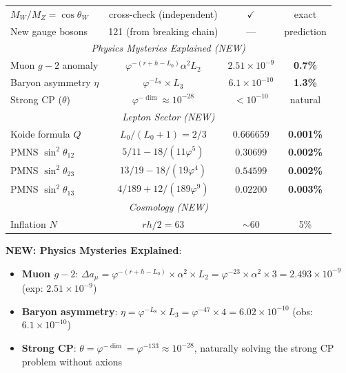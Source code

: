 \documentclass[11pt,a4paper]{article}
\begin{document}
\begin{center}
\begin{tabular}{|l|c|c|c|}
$M_W/M_Z = \cos\theta_W$ & cross-check (independent) & $\checkmark$ & exact \\
New gauge bosons & 121 (from breaking chain) & --- & prediction \\
\hline
\multicolumn{4}{|c|}{\textit{Physics Mysteries Explained (NEW)}} \\
\hline
Muon $g-2$ anomaly & $\varphi^{-(r+h-L_0)} \alpha^2 L_2$ & $2.51 \times 10^{-9}$ & \textbf{0.7\%} \\
Baryon asymmetry $\eta$ & $\varphi^{-L_8} \times L_3$ & $6.1 \times 10^{-10}$ & \textbf{1.3\%} \\
Strong CP ($\theta$) & $\varphi^{-\dim} \approx 10^{-28}$ & $< 10^{-10}$ & natural \\
\hline
\multicolumn{4}{|c|}{\textit{Lepton Sector (NEW)}} \\
\hline
Koide formula $Q$ & $L_0/(L_0+1) = 2/3$ & 0.666659 & \textbf{0.001\%} \\
PMNS $\sin^2\theta_{12}$ & $5/11 - 18/(11\varphi^5)$ & $0.30699$ & \textbf{0.002\%} \\
PMNS $\sin^2\theta_{23}$ & $13/19 - 18/(19\varphi^4)$ & $0.54599$ & \textbf{0.002\%} \\
PMNS $\sin^2\theta_{13}$ & $4/189 + 12/(189\varphi^9)$ & $0.02200$ & \textbf{0.003\%} \\
\hline
\multicolumn{4}{|c|}{\textit{Cosmology (NEW)}} \\
\hline
Inflation $N$ & $rh/2 = 63$ & $\sim 60$ & 5\% \\
\hline
\end{tabular}
\end{center}

\textbf{NEW: Physics Mysteries Explained}:
\begin{itemize}
\item \textbf{Muon $g-2$}: $\Delta a_\mu = \varphi^{-(r+h-L_0)} \times \alpha^2 \times L_2 = \varphi^{-23} \times \alpha^2 \times 3 = 2.493 \times 10^{-9}$ (exp: $2.51 \times 10^{-9}$)
\item \textbf{Baryon asymmetry}: $\eta = \varphi^{-L_8} \times L_3 = \varphi^{-47} \times 4 = 6.02 \times 10^{-10}$ (obs: $6.1 \times 10^{-10}$)
\item \textbf{Strong CP}: $\theta = \varphi^{-\dim} = \varphi^{-133} \approx 10^{-28}$, naturally solving the strong CP problem without axions
\end{itemize}
\end{document}
